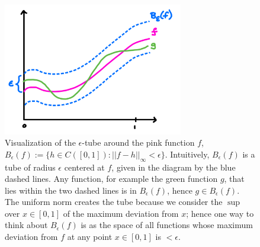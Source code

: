 	\begin{figure}[!htp]
		\centering
		\includegraphics[width = 0.7\textwidth]{epsilon_tube}
		\caption{Visualization of the $\epsilon$-tube around the pink function $f$, $B_\epsilon(f) := \{h\in C([0, 1]) : ||f - h||_\infty < \epsilon\}$. Intuitively, $B_\epsilon(f)$ is a tube of radius $\epsilon$ centered at $f$, given in the diagram by the blue dashed lines. Any function, for example the green function $g$, that lies within the two dashed lines is in $B_\epsilon(f)$, hence $g\in B_\epsilon(f)$. The uniform norm creates the tube because we consider the $\sup$ over $x\in [0, 1]$ of the maximum deviation from $x$; hence one way to think about $B_\epsilon(f)$ is as the space of all functions whose maximum deviation from $f$ at any point $x\in [0, 1]$ is $< \epsilon$.}
		\label{fig:eps_tube}
	\end{figure}
	

